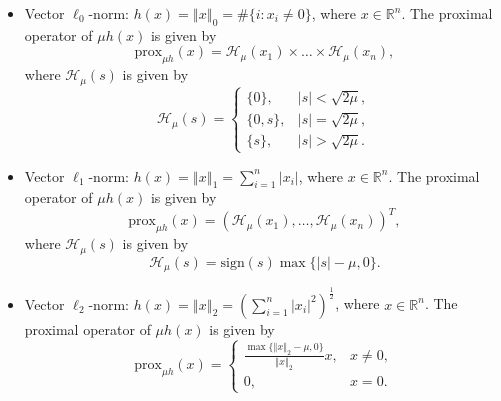 \documentclass[a4paper]{article}
\newcommand{\norm}[1]{\left\Vert#1\right\Vert}
\newcommand{\mr}{\mathbb{R}}
\newcommand{\mh}{\mathcal{H}}
\newcommand{\prox}{\mathrm{prox}}
\newcommand{\sign}{\mathrm{sign}}
\begin{document}
\begin{itemize}
  \item {Vector $\ell_0$-norm:} $h(x) = \norm{x}_0 = \# \{i:x_i 
  \ne 0\}$, where $x \in \mr^n$. The proximal operator of $\mu h(x)$ 
  is 
  given by
  \begin{displaymath}
    \prox_{\mu h}(x) = \mh_{\mu}(x_1) \times \ldots \times 
    \mh_{\mu}(x_n),
  \end{displaymath}
  where $\mh_{\mu}(s)$ is given by
  \begin{displaymath}
    \mh_{\mu}(s) = 
    \begin{cases}
      \{0\},    & |s| < \sqrt{2\mu}, \\
      \{0, s\}, & |s| = \sqrt{2\mu}, \\
      \{s\},    & |s| > \sqrt{2\mu}.
    \end{cases}
  \end{displaymath}
  
  \item {Vector $\ell_1$-norm:} $h(x) = \norm{x}_1 = 
  \sum_{i=1}^{n} |x_i|$, where $x \in \mr^n$. The proximal operator 
  of 
  $\mu h(x)$ is given by
  \begin{displaymath}
    \prox_{\mu h}(x) = (\mh_{\mu}(x_1), \ldots, \mh_{\mu}(x_n))^T,
  \end{displaymath}
  where $\mh_{\mu}(s)$ is given by
  \begin{displaymath}
    \mh_{\mu}(s) = \sign(s) \max\{ |s| - \mu, 0 \}.
  \end{displaymath}
  
  \item {Vector $\ell_2$-norm:} $h(x) = \norm{x}_2 = 
  \left( \sum_{i=1}^{n} |x_i|^2 \right)^{\frac{1}{2}}$, where $x \in 
  \mr^n$. The proximal operator of $\mu h(x)$ is given by
  \begin{displaymath}
    \prox_{\mu h}(x) = 
    \begin{cases}
      \frac{\max\{ \norm{x}_2 - \mu, 0 \}}{\norm{x}_2} x, & x \ne 0, 
      \\
      0, & x = 0.
    \end{cases}
  \end{displaymath}
  

\end{itemize}
\end{document}
